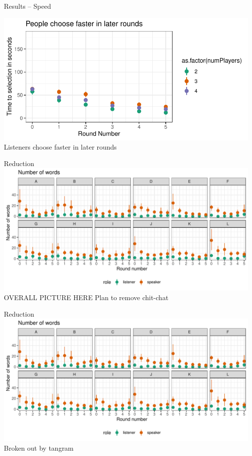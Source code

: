 \documentclass[ 12pt, xcolor=beamer,table,usenames,dvipsnames, ignorenonframetext, ngerman]{beamer}
\begin{document}
\begin{frame}{Results -- Speed}
	
	\includegraphics[width=\textwidth]{../images/time.pdf}
	Listeners choose faster in later rounds
	
\end{frame}

\begin{frame}{Reduction}
\includegraphics[width=\textwidth]{../images/words.pdf}
OVERALL PICTURE HERE
Plan to remove chit-chat
\end{frame}

\begin{frame}{Reduction}
	\includegraphics[width=\textwidth]{../images/words.pdf}
Broken out by tangram
\end{frame}
\end{document}
